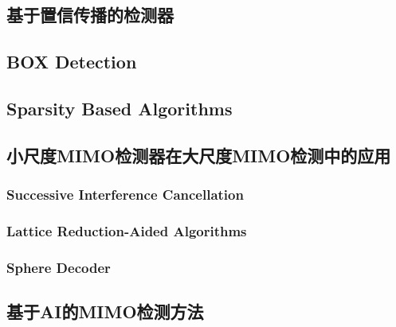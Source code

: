 \subsection{基于置信传播的检测器}
\subsection{BOX Detection}
\subsection{Sparsity Based Algorithms}
\subsection{小尺度MIMO检测器在大尺度MIMO检测中的应用}
\subsubsection{Successive Interference Cancellation}
\subsubsection{Lattice Reduction-Aided Algorithms}
\subsubsection{Sphere Decoder}
\subsection{基于AI的MIMO检测方法}

